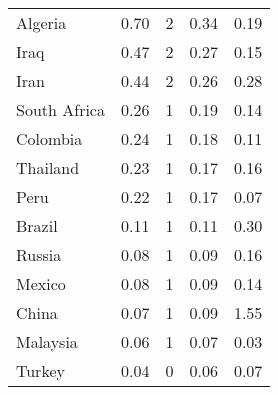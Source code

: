 \begin{longtable}[t]{lrrrr}
Algeria & 0.70 & 2 & 0.34 & 0.19\\
Iraq & 0.47 & 2 & 0.27 & 0.15\\
Iran & 0.44 & 2 & 0.26 & 0.28\\
South Africa & 0.26 & 1 & 0.19 & 0.14\\
Colombia & 0.24 & 1 & 0.18 & 0.11\\
Thailand & 0.23 & 1 & 0.17 & 0.16\\
Peru & 0.22 & 1 & 0.17 & 0.07\\
Brazil & 0.11 & 1 & 0.11 & 0.30\\
Russia & 0.08 & 1 & 0.09 & 0.16\\
Mexico & 0.08 & 1 & 0.09 & 0.14\\
China & 0.07 & 1 & 0.09 & 1.55\\
Malaysia & 0.06 & 1 & 0.07 & 0.03\\
Turkey & 0.04 & 0 & 0.06 & 0.07\\
\bottomrule
\end{longtable}